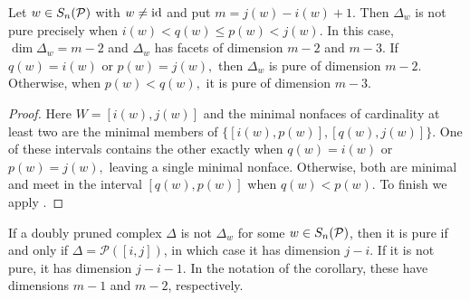 \begin{corollary}
\label{cor: purity of doubly pruned complexes}
    Let $w\in S_n(\mathcal{P})$ with $w\neq\mathrm{id}$ and put $m = j(w) - i(w) + 1.$ Then $\Delta_w$ is not pure precisely when $i(w)<q(w)\leq p(w)<j(w).$ In this case, $\dim\Delta_w = m - 2$ and $\Delta_w$ has facets of dimension $m - 2$ and $m - 3.$
    If $q(w) = i(w)$ or $p(w) = j(w),$ then $\Delta_w$ is pure of dimension $m - 2.$ Otherwise, when $p(w) < q(w),$ it is pure of dimension $m - 3.$
\end{corollary}
\begin{proof}
    Here $W = [i(w),j(w)]$ and the minimal nonfaces of cardinality at least two are the minimal members of $\{[i(w),p(w)],[q(w),j(w)]\}.$ One of these intervals contains the other exactly when $q(w) = i(w)$ or $p(w) = j(w),$ leaving a single minimal nonface. Otherwise, both are minimal and meet in the interval $[q(w),p(w)]$ when $q(w)<p(w)$.
    To finish we apply .
\end{proof}

\begin{remark}
    \label{rem: doubly pruned purity}
    If a doubly pruned complex $\Delta$ is not $\Delta_w$ for some $w\in S_n(\mathcal{P})$, then it is pure if and only if $\Delta = \mathscr{P}([i,j])$, in which case it has dimension $j-i$. 
    If it is not pure, it has dimension $j-i-1$.
    In the notation of the corollary, these have dimensions $m-1$ and $m-2$, respectively.
\end{remark}


